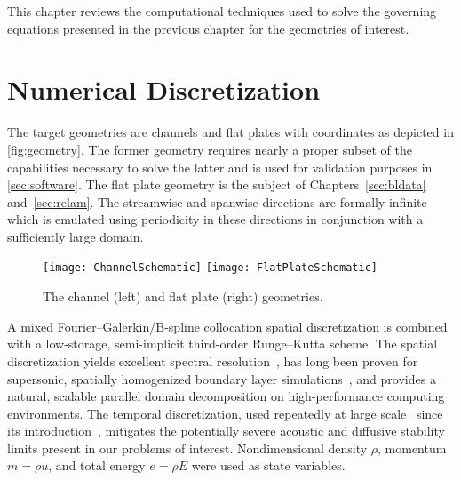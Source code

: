 \label{sec:techniques}

This chapter reviews the computational techniques used to solve the governing
equations presented in the previous chapter for the geometries of interest.

\section{Numerical Discretization}
\label{sec:discretization}

The target geometries are channels and flat plates with coordinates as depicted
in \autoref{fig:geometry}.  The former geometry requires nearly a proper subset
of the capabilities necessary to solve the latter and is used for validation
purposes in \autoref{sec:software}.  The flat plate geometry is the subject
of Chapters~\ref{sec:bldata} and~\ref{sec:relam}.
The streamwise and spanwise directions are formally infinite which is emulated
using periodicity in these directions in conjunction with a sufficiently large
domain.

\begin{figure}
\centering
\texttt{[image: ChannelSchematic]}
\texttt{[image: FlatPlateSchematic]}
\\
\caption[The channel and flat plate geometries]{%
  The channel (left) and flat plate (right) geometries. \label{fig:geometry}
}
\end{figure}

A mixed Fourier--Galerkin/B-spline collocation spatial
discretization is combined with a low-storage, semi-implicit third-order
Runge--Kutta scheme.  The spatial discretization yields excellent spectral
resolution~\citep{Kwok2001}, has long been proven for supersonic,
spatially homogenized boundary layer simulations~\citep{Guarini2000Direct}, and
provides a natural, scalable parallel domain decomposition on high-performance computing
environments.  The temporal discretization, used repeatedly at large
scale~\citep[e.g.][]{Hoyas2006Scaling} since its
introduction~\citep{spalart_lowstoragerk}, mitigates the potentially severe
acoustic and diffusive stability limits present in our problems of interest.
Nondimensional density $\rho$, momentum $m=\rho{}u$, and total energy
$e=\rho{}E$ were used as state variables.


